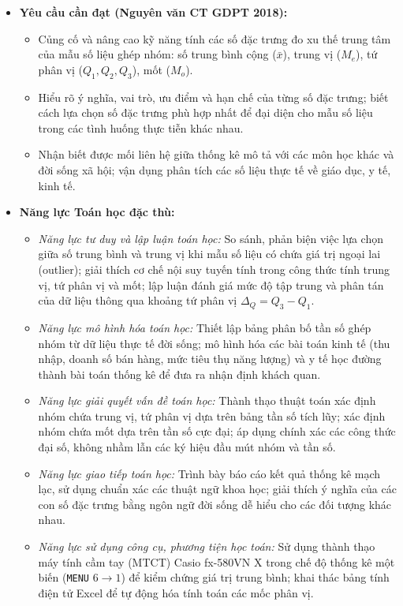 \documentclass[12pt, a4paper]{article}
\begin{document}
\begin{itemize}[leftmargin=1.2cm]
    \item \textbf{Yêu cầu cần đạt (Nguyên văn CT GDPT 2018):}
    \begin{itemize}[leftmargin=0.6cm]
        \item Củng cố và nâng cao kỹ năng tính các số đặc trưng đo xu thế trung tâm của mẫu số liệu ghép nhóm: số trung bình cộng ($\bar{x}$), trung vị ($M_e$), tứ phân vị ($Q_1, Q_2, Q_3$), mốt ($M_o$).
        \item Hiểu rõ ý nghĩa, vai trò, ưu điểm và hạn chế của từng số đặc trưng; biết cách lựa chọn số đặc trưng phù hợp nhất để đại diện cho mẫu số liệu trong các tình huống thực tiễn khác nhau.
        \item Nhận biết được mối liên hệ giữa thống kê mô tả với các môn học khác và đời sống xã hội; vận dụng phân tích các số liệu thực tế về giáo dục, y tế, kinh tế.
    \end{itemize}

    \item \textbf{Năng lực Toán học đặc thù:}
    \begin{itemize}[leftmargin=0.6cm]
        \item \textit{Năng lực tư duy và lập luận toán học:} So sánh, phản biện việc lựa chọn giữa số trung bình và trung vị khi mẫu số liệu có chứa giá trị ngoại lai (outlier); giải thích cơ chế nội suy tuyến tính trong công thức tính trung vị, tứ phân vị và mốt; lập luận đánh giá mức độ tập trung và phân tán của dữ liệu thông qua khoảng tứ phân vị $\Delta_Q = Q_3 - Q_1$.
        \item \textit{Năng lực mô hình hóa toán học:} Thiết lập bảng phân bố tần số ghép nhóm từ dữ liệu thực tế đời sống; mô hình hóa các bài toán kinh tế (thu nhập, doanh số bán hàng, mức tiêu thụ năng lượng) và y tế học đường thành bài toán thống kê để đưa ra nhận định khách quan.
        \item \textit{Năng lực giải quyết vấn đề toán học:} Thành thạo thuật toán xác định nhóm chứa trung vị, tứ phân vị dựa trên bảng tần số tích lũy; xác định nhóm chứa mốt dựa trên tần số cực đại; áp dụng chính xác các công thức đại số, không nhầm lẫn các ký hiệu đầu mút nhóm và tần số.
        \item \textit{Năng lực giao tiếp toán học:} Trình bày báo cáo kết quả thống kê mạch lạc, sử dụng chuẩn xác các thuật ngữ khoa học; giải thích ý nghĩa của các con số đặc trưng bằng ngôn ngữ đời sống dễ hiểu cho các đối tượng khác nhau.
        \item \textit{Năng lực sử dụng công cụ, phương tiện học toán:} Sử dụng thành thạo máy tính cầm tay (MTCT) Casio fx-580VN X trong chế độ thống kê một biến (\texttt{MENU} $6 \to 1$) để kiểm chứng giá trị trung bình; khai thác bảng tính điện tử Excel để tự động hóa tính toán các mốc phân vị.
    \end{itemize}


\end{itemize}
\end{document}
